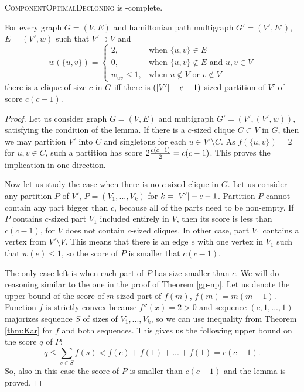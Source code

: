 \begin{thm} \label{ultimate-theorem}
\textsc{ComponentOptimalDecloning} is \np-complete.
\end{thm}

\begin{lmm} \label{hpmd-red}
For every graph $G=(V,E)$ and hamiltonian path multigraph $G'=(V',E')$, $E=(V',w)$ such that $V' \supset V$ and
$$ w(\{u,v\}) =
\begin{cases}
2, 				&\text{when } \{u,v\} \in E \\
0, 				&\text{when } \{u,v\} \not\in E \text{ and } u,v \in V \\
w_{u v}\leq 1,	&\text{when } u \not\in V \text{ or } v \not\in V
\end{cases}
$$
there is a clique of size $c$ in $G$ iff
there is $\left(\left\vert V' \right\vert-c-1\right)$-sized partition of $V'$ of score $c(c-1)$.
\end{lmm}

\begin{proof} \label{hpmp-red-2}
Let us consider graph $G=(V,E)$ and multigraph $G'=(V',(V',w))$, satisfying the condition of the lemma.
If there is a $c$-sized clique $C \subset V$ in $G$,
then we may partition $V'$ into $C$ and singletons for each $u \in V' \setminus C$.
As $f(\{u,v\})=2$ for $u,v \in C$, such a partition has score $2 {c(c-1) \over 2} = c(c-1)$.
This proves the implication in one direction.

Now let us study the case when there is no $c$-sized clique in $G$.
Let us consider any partition $P$ of $V'$, $P=(V_1, ..., V_k)$ for $k = \left\vert V' \right\vert-c-1$.
Partition $P$ cannot contain any part bigger than $c$,
because all of the parts need to be non-empty.
If $P$ contains $c$-sized part $V_1$ included entirely in $V$, then its score is less than $c(c-1)$,
for $V$ does not contain $c$-sized cliques.
In other case, part $V_1$ contains a vertex from $V' \setminus V$.
This means that there is an edge $e$ with one vertex in $V_1$ such that $w(e) \leq 1$,
so the score of $P$ is smaller that $c(c-1)$.

The only case left is when each part of $P$ has size smaller than $c$.
We will do reasoning similar to the one in the proof of Theorem \ref{gp-np}.
Let us denote the upper bound of the score of $m$-sized part of $f(m)$, $f(m) = m(m-1)$.
Function $f$ is strictly convex because $f''(x) = 2 > 0$
and sequence $(c,1,...,1)$ majorizes sequence $S$ of sizes of $V_1, ..., V_k$,
so we can use inequality from Theorem \ref{thm:Kar}
for $f$ and both sequences.
This gives us the following upper bound on the score $q$ of $P$:
$$q \leq \sum_{s \in S} f(s) < f(c) + f(1) + ... + f(1) = c(c-1) \text{.}$$
So, also in this case the score of $P$ is smaller than $c(c-1)$ and the lemma is proved.
\end{proof}

